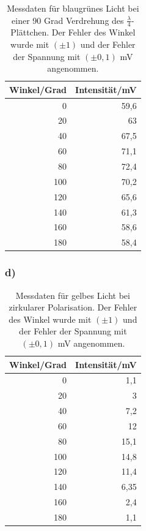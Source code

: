 \documentclass[12pt]{scrartcl}
\begin{document}
\begin{table}[htbp]
\caption{Messdaten für blaugrünes Licht bei einer 90 Grad Verdrehung des $\frac{\lambda}{4}$-Plättchen. Der Fehler des Winkel wurde mit $(\pm 1)$ und der Fehler der Spannung mit $(\pm 0,1)$ mV angenommen.}
\begin{center}
\begin{tabular}{|r|r|}
\hline
\multicolumn{1}{|l|}{Winkel/Grad} & \multicolumn{1}{l|}{Intensität/mV} \\ \hline
0 & 59,6 \\ \hline
20 & 63 \\ \hline
40 & 67,5 \\ \hline
60 & 71,1 \\ \hline
80 & 72,4 \\ \hline
100 & 70,2 \\ \hline
120 & 65,6 \\ \hline
140 & 61,3 \\ \hline
160 & 58,6 \\ \hline
180 & 58,4 \\ \hline
\end{tabular}
\end{center}
\label{tab:a_5_c_bg}
\end{table}

\subsubsection{d)}

\begin{table}[htbp]
\caption{Messdaten für gelbes Licht bei zirkularer Polarisation. Der Fehler des Winkel wurde mit $(\pm 1)$ und der Fehler der Spannung mit $(\pm 0,1)$ mV angenommen.}
\begin{center}
\begin{tabular}{|r|r|}
\hline
\multicolumn{1}{|l|}{Winkel/Grad} & \multicolumn{1}{l|}{Intensität/mV} \\ \hline
0 & 1,1 \\ \hline
20 & 3 \\ \hline
40 & 7,2 \\ \hline
60 & 12 \\ \hline
80 & 15,1 \\ \hline
100 & 14,8 \\ \hline
120 & 11,4 \\ \hline
140 & 6,35 \\ \hline
160 & 2,4 \\ \hline
180 & 1,1 \\ \hline
\end{tabular}
\end{center}
\label{tab:a_5_s_g}
\end{table}
\end{document}
